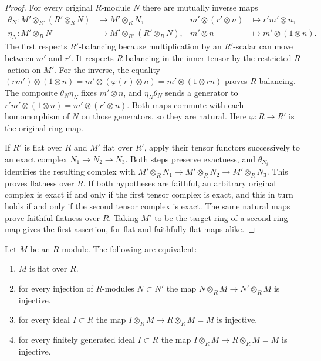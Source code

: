 \begin{proof}
For every original $R$-module $N$ there are mutually inverse
maps
$$
\begin{aligned}
\theta_N:M'\otimes_{R'}(R'\otimes_R N)&\longrightarrow M'\otimes_R N,
&m'\otimes(r'\otimes n)&\longmapsto r'm'\otimes n,\\
\eta_N:M'\otimes_R N&\longrightarrow M'\otimes_{R'}(R'\otimes_R N),
&m'\otimes n&\longmapsto m'\otimes(1\otimes n).
\end{aligned}
$$
The first respects $R'$-balancing because multiplication by
an $R'$-scalar can move between $m'$ and $r'$. It respects
$R$-balancing in the inner tensor by the restricted $R$-action
on $M'$. For the inverse, the equality
$(rm')\otimes(1\otimes n)=m'\otimes(\varphi(r)\otimes n)
=m'\otimes(1\otimes rn)$ proves $R$-balancing.
The composite $\theta_N\eta_N$ fixes $m'\otimes n$, and
$\eta_N\theta_N$ sends a generator to
$r'm'\otimes(1\otimes n)=m'\otimes(r'\otimes n)$.
Both maps commute with each homomorphism of $N$ on those
generators, so they are natural. Here $\varphi:R\to R'$
is the original ring map.

If $R'$ is flat over $R$ and $M'$ flat over $R'$, apply
their tensor functors successively to an exact complex
$N_1\to N_2\to N_3$. Both steps preserve exactness, and
$\theta_{N_i}$ identifies the resulting complex with
$M'\otimes_R N_1\to M'\otimes_R N_2\to M'\otimes_R N_3$.
This proves flatness over $R$. If both hypotheses are faithful,
an arbitrary original complex is exact if and only if the
first tensor complex is exact, and this in turn holds if
and only if the second tensor complex is exact. The same
natural maps prove faithful flatness over $R$. Taking $M'$
to be the target ring of a second ring map gives the first
assertion, for flat and faithfully flat maps alike.
\end{proof}

\begin{lemma}
\label{editorial-source-lemma-flat}
Let $M$ be an $R$-module. The following are equivalent:
\begin{enumerate}
\item
\label{editorial-source-item-flat}
$M$ is flat over $R$.
\item
\label{editorial-source-item-injective}
for every injection of $R$-modules $N \subset N'$
the map $N \otimes_R M \to N'\otimes_R M$ is injective.
\item
\label{editorial-source-item-f-ideal}
for every ideal $I \subset R$ the map
$I \otimes_R M \to R \otimes_R M = M$ is injective.
\item
\label{editorial-source-item-ffg-ideal}
for every finitely generated ideal $I \subset R$
the map $I \otimes_R M \to R \otimes_R M = M$ is injective.
\end{enumerate}
\end{lemma}

